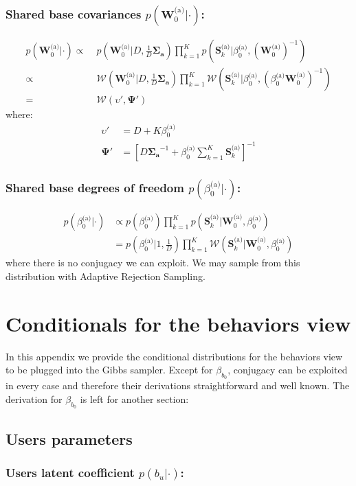 \documentclass[smallextended]{svjour3}          %
\newcommand{\Wo}{\mathbf{W}_{0}^\text{(a)}}
\newcommand{\invWo}{\left(\mathbf{W}_{0}^{\text{(a)}}\right)^{-1}}
\newcommand{\betaoa}{\beta_{0}^\text{(a)}}
\newcommand{\Sk}{\mathbf{S}_{k}^\text{(a)}}
\begin{document}
\subsubsection*{Shared base covariances $p(\Wo | \cdot)$:}
\begin{align*}
p(\Wo | \cdot) 
\propto\;&
p\left(\Wo  | D, \frac{1}{D} \boldsymbol{\Sigma_a}\right) 
\prod_{k=1}^K p\left(\Sk | \betaoa, \invWo\right)\\
\propto\;&
\mathcal{W}\left(\Wo | D, \frac{1}{D} \boldsymbol{\Sigma_a}\right)
\prod_{k=1}^K \mathcal{W}\left(\Sk | \betaoa, \left(\betaoa\Wo\right)^{-1}\right)\\
=\;&
\mathcal{W}(\upsilon', \boldsymbol{\Psi}')
\end{align*}
where:
\begin{align*} 
\upsilon' &=D + K\betaoa\\
\boldsymbol{\Psi}' &=
\left[D\boldsymbol{\Sigma_a}^{-1} +  \betaoa\sum_{k=1}^K\Sk\right]^{-1}
\end{align*}

\subsubsection*{Shared base degrees of freedom $p(\betaoa | \cdot)$:}
\begin{align*}
p(\betaoa | \cdot) 
&\propto 
p(\betaoa) \prod_{k=1}^K p\left(\Sk | \Wo ,  \betaoa\right)\\
&=p(\betaoa | 1, \frac{1}{D})\prod_{k=1}^K  \mathcal{W} \left(\Sk | \Wo ,  \betaoa\right)
\end{align*}
where there is no conjugacy we can exploit. We may sample from this distribution with Adaptive Rejection Sampling.

\section{Conditionals for the behaviors view}
In this appendix we provide the conditional distributions for the behaviors view to be plugged into the Gibbs sampler. Except for $\beta_{b_0}$, conjugacy can be exploited in every case and therefore their derivations straightforward and well known. The derivation for $\beta_{b_0}$ is left for another section:
\subsection{Users parameters}
\subsubsection*{Users latent coefficient $p(b_u | \cdot )$:}
\end{document}
